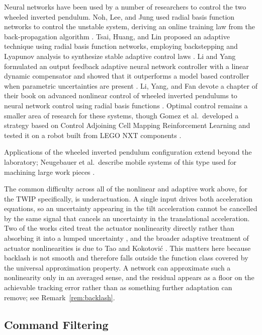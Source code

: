 Neural networks have been used by a number of researchers to control the two
wheeled inverted pendulum. Noh, Lee, and Jung used radial basis function
networks to control the unstable system, deriving an online training law from
the back-propagation algorithm \cite{noh2008position,jung2008control}. Tsai,
Huang, and Lin proposed an adaptive technique using radial basis function
networks, employing backstepping and Lyapunov analysis to synthesize stable
adaptive control laws \cite{tsai2010adaptive}. Li and Yang formulated an output
feedback adaptive neural network controller with a linear dynamic compensator
and showed that it outperforms a model based controller when parametric
uncertainties are present \cite{li2012neural}. Li, Yang, and Fan devote a
chapter of their book on advanced nonlinear control of wheeled inverted
pendulums to neural network control using radial basis functions
\cite{li2013advanced}. Optimal control remains a smaller area of research for
these systems, though Gomez et al.\ developed a strategy based on Control
Adjoining Cell Mapping Reinforcement Learning and tested it on a robot built
from LEGO NXT components \cite{gomez2012optimal}.

Applications of the wheeled inverted pendulum configuration extend beyond the
laboratory; Neugebauer et al.\ describe mobile systems of this type used for
machining large work pieces \cite{neugebauer2012mobile}.

The common difficulty across all of the nonlinear and adaptive work above,
for the TWIP specifically, is underactuation. A single input drives both
acceleration equations, so an uncertainty appearing in the tilt acceleration
cannot be cancelled by the same signal that cancels an uncertainty in the
translational acceleration. Two of the works cited treat the actuator
nonlinearity directly rather than absorbing it into a lumped uncertainty
\cite{grasser2002joe,durdevic2013hybrid}, and the broader adaptive treatment of
actuator nonlinearities is due to Tao and Kokotovi\'c \cite{tao1993backlash}.
This matters here because backlash is not smooth and therefore falls outside the
function class covered by the universal approximation property. A network can
approximate such a nonlinearity only in an averaged sense, and the residual
appears as a floor on the achievable tracking error rather than as something
further adaptation can remove; see Remark~\ref{rem:backlash}.

\subsection{Command Filtering}

